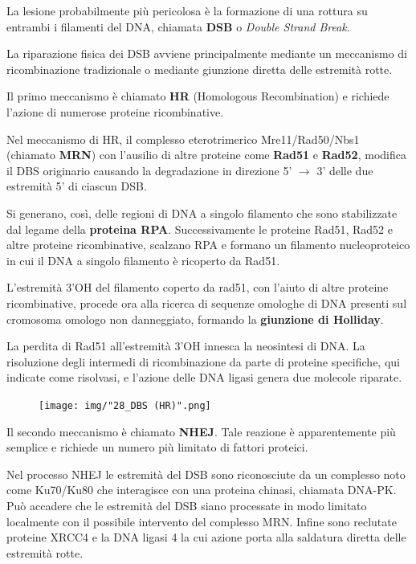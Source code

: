\documentclass[11pt]{book}
\begin{document}
La lesione probabilmente più pericolosa è la formazione di una rottura
su entrambi i filamenti del DNA, chiamata \textbf{DSB} o \emph{Double
Strand Break}.

La riparazione fisica dei DSB avviene principalmente mediante un
meccanismo di ricombinazione tradizionale o mediante giunzione diretta
delle estremità rotte.

Il primo meccanismo è chiamato \textbf{HR} (Homologous Recombination) e
richiede l'azione di numerose proteine ricombinative.

Nel meccanismo di HR, il complesso eterotrimerico Mre11/Rad50/Nbs1
(chiamato \textbf{MRN}) con l'ausilio di altre proteine come
\textbf{Rad51} e \textbf{Rad52}, modifica il DBS originario causando la
degradazione in direzione 5' \(\rightarrow\) 3' delle due estremità 5'
di ciascun DSB.

Si generano, così, delle regioni di DNA a singolo filamento che sono
stabilizzate dal legame della \textbf{proteina RPA}. Successivamente le
proteine Rad51, Rad52 e altre proteine ricombinative, scalzano RPA e
formano un filamento nucleoproteico in cui il DNA a singolo filamento è
ricoperto da Rad51.

L'estremità 3'OH del filamento coperto da rad51, con l'aiuto di altre
proteine ricombinative, procede ora alla ricerca di sequenze omologhe di
DNA presenti sul cromosoma omologo non danneggiato, formando la
\textbf{giunzione di Holliday}.

La perdita di Rad51 all'estremità 3'OH innesca la neosintesi di DNA. La
risoluzione degli intermedi di ricombinazione da parte di proteine
specifiche, qui indicate come risolvasi, e l'azione delle DNA ligasi
genera due molecole riparate.

\clearpage

\begin{figure}[htp]
\centering
\texttt{[image: img/"28\_DBS (HR)".png]}
\caption{}
\label{dbs-hr}
\end{figure}

\clearpage

Il secondo meccanismo è chiamato \textbf{NHEJ}. Tale reazione è
apparentemente più semplice e richiede un numero più limitato di fattori
proteici.

Nel processo NHEJ le estremità del DSB sono riconosciute da un complesso
noto come Ku70/Ku80 che interagisce con una proteina chinasi, chiamata
DNA-PK. Può accadere che le estremità del DSB siano processate in modo
limitato localmente con il possibile intervento del complesso MRN.
Infine sono reclutate proteine XRCC4 e la DNA ligasi 4 la cui azione
porta alla saldatura diretta delle estremità rotte.
\end{document}
